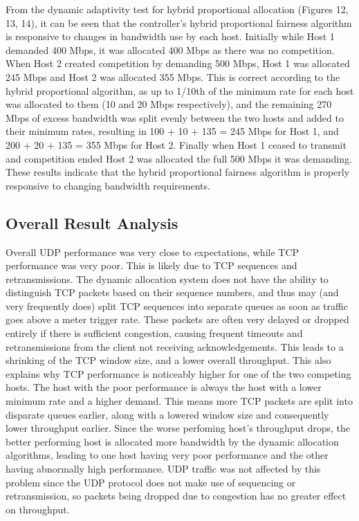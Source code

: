 \documentclass[accepted,single]{gipaper}
\begin{document}
From the dynamic adaptivity test for hybrid proportional allocation (Figures 12, 13, 14), it can be seen that the controller's hybrid proportional fairness algorithm is responsive to changes in bandwidth use by each host. Initially while Host 1 demanded 400 Mbps, it was allocated 400 Mbps as there was no competition. When Host 2 created competition by demanding 500 Mbps, Host 1 was allocated 245 Mbps and Host 2 was allocated 355 Mbps. This is correct according to the hybrid proportional algorithm, as up to 1/10th of the minimum rate for each host was allocated to them (10 and 20 Mbps respectively), and the remaining 270 Mbps of excess bandwidth was split evenly between the two hosts and added to their minimum rates, resulting in 100 + 10 + 135  = 245 Mbps for Host 1, and 200 + 20 + 135 = 355 Mbps for Host 2. Finally when Host 1 ceased to transmit and competition ended Host 2 was allocated the full 500 Mbps it was demanding. These results indicate that the hybrid proportional fairness algorithm is properly responsive to changing bandwidth requirements.

\subsection{Overall Result Analysis}
\label{result_analysis}

Overall UDP performance was very close to expectations, while TCP performance was very poor. This is likely due to TCP sequences and retransmissions. The dynamic allocation system does not have the ability to distinguish TCP packets based on their sequence numbers, and thus may (and very frequently does) split TCP sequences into separate queues as soon as traffic goes above a meter trigger rate. These packets are often very delayed or dropped entirely if there is sufficient congestion, causing frequent timeouts and retransmissions from the client not receiving acknowledgements. This leads to a shrinking of the TCP window size, and a lower overall throughput. This also explains why TCP performance is noticeably higher for one of the two competing hosts. The host with the poor performance is always the host with a lower minimum rate and a higher demand. This means more TCP packets are split into disparate queues earlier, along with a lowered window size and consequently lower throughput earlier. Since the worse perfoming host's throughput drops, the better performing host is allocated more bandwidth by the dynamic allocation algorithms, leading to one host having very poor performance and the other having abnormally high performance. UDP traffic was not affected by this problem since the UDP protocol does not make use of sequencing or retransmission, so packets being dropped due to congestion has no greater effect on throughput.
\end{document}
